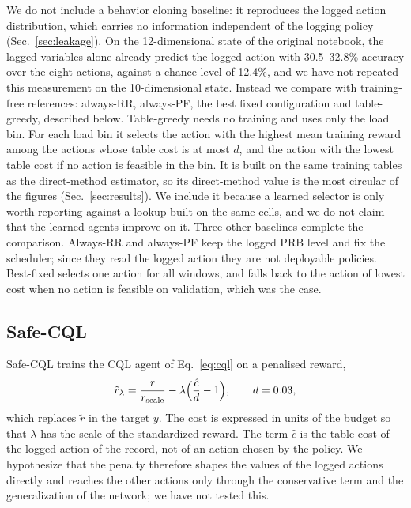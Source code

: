We do not include a behavior cloning baseline: it reproduces the logged action distribution, which carries no information independent of the logging policy (Sec.~\ref{sec:leakage}).%
On the 12-dimensional state of the original notebook, the lagged variables alone already predict the logged action with 30.5--32.8\% accuracy over the eight actions, against a chance level of 12.4\%, and we have not repeated this measurement on the 10-dimensional state.%
Instead we compare with training-free references: always-RR, always-PF, the best fixed configuration and table-greedy, described below.%
Table-greedy needs no training and uses only the load bin.%
For each load bin it selects the action with the highest mean training reward among the actions whose table cost is at most $d$, and the action with the lowest table cost if no action is feasible in the bin.%
It is built on the same training tables as the direct-method estimator, so its direct-method value is the most circular of the figures (Sec.~\ref{sec:results}).%
We include it because a learned selector is only worth reporting against a lookup built on the same cells, and we do not claim that the learned agents improve on it.%
Three other baselines complete the comparison.%
Always-RR and always-PF keep the logged PRB level and fix the scheduler; since they read the logged action they are not deployable policies.%
Best-fixed selects one action for all windows, and falls back to the action of lowest cost when no action is feasible on validation, which was the case.%

\subsection{Safe-CQL}
\label{sec:safecql}

Safe-CQL trains the CQL agent of Eq.~\eqref{eq:cql} on a penalised reward,
\begin{equation}
  \tilde r_\lambda=\frac{r}{r_{\mathrm{scale}}}-\lambda\Bigl(\frac{\hat c}{d}-1\Bigr),\qquad d=0.03,
  \label{eq:safe_reward}
\end{equation}%
which replaces $\tilde r$ in the target $y$.%
The cost is expressed in units of the budget so that $\lambda$ has the scale of the standardized reward.%
The term $\hat c$ is the table cost of the logged action of the record, not of an action chosen by the policy.%
We hypothesize that the penalty therefore shapes the values of the logged actions directly and reaches the other actions only through the conservative term and the generalization of the network; we have not tested this.%

